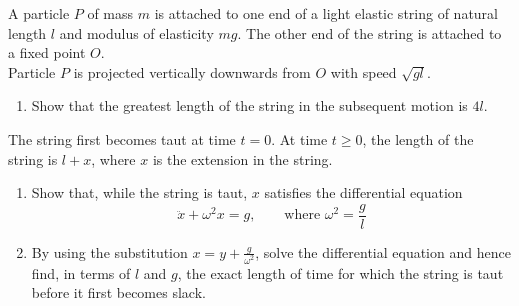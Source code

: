 \documentclass[leqno]{article}
\begin{document}
\begin{enumerate}[
  label=\textbf{\arabic*.},
  leftmargin=*,
  topsep=0pt,
  partopsep=0pt,
  parsep=0pt
]
\newpage

\questionitem

A particle $P$ of mass $m$ is attached to one end of a light elastic string of natural length $l$ and modulus of elasticity $mg$. The other end of the string is attached to a fixed point $O$. \\
Particle $P$ is projected vertically downwards from $O$ with speed $\sqrt{gl}$. \\
\begin{enumerate}[label=\textbf{(\alph*)}]
\item Show that the greatest length of the string in the subsequent motion is $4l$.  \\
\end{enumerate}
The string first becomes taut at time $t=0$. At time $t \ge 0$, the length of the string is $l+x$, where $x$ is the extension in the string. \\
\begin{enumerate}[label=\textbf{(\alph*)},resume]
\item Show that, while the string is taut, $x$ satisfies the differential equation
\[
\ddot{x}+\omega^2 x=g, \qquad \text{where } \omega^2=\dfrac{g}{l}
\]
\item By using the substitution $x=y+\frac{g}{\omega^2}$, solve the differential equation and hence find, in terms of $l$ and $g$, the exact length of time for which the string is taut before it first becomes slack.  \\
\end{enumerate}

\end{enumerate}
\end{document}
